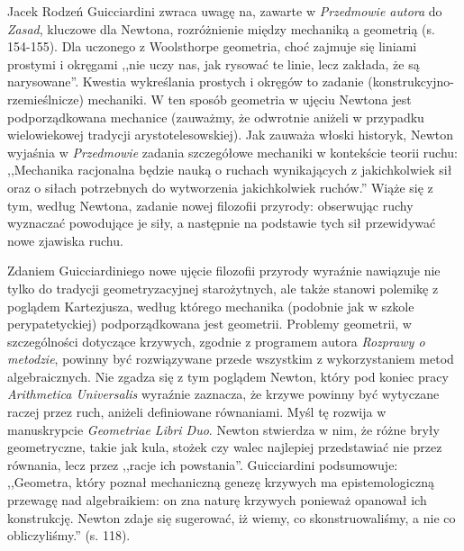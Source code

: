 \begin{recplenv}{Jacek Rodzeń}
Guicciardini zwraca uwagę na, zawarte w \textit{Przedmowie autora} do \textit{Zasad}, kluczowe dla Newtona,
rozróżnienie między mechaniką a geometrią (s. 154-155). Dla uczonego z Woolsthorpe geometria, choć zajmuje się liniami
prostymi i okręgami ,,nie uczy nas, jak rysować te linie, lecz zakłada, że są narysowane''. Kwestia wykreślania prostych
i okręgów to zadanie (konstrukcyjno-rzemieślnicze) mechaniki. W ten sposób geometria w ujęciu Newtona jest
podporządkowana mechanice (zauważmy, że odwrotnie aniżeli w przypadku wielowiekowej tradycji arystotelesowskiej). Jak
zauważa włoski historyk, Newton wyjaśnia w \textit{Przedmowie} zadania szczegółowe mechaniki w kontekście teorii ruchu:
,,Mechanika racjonalna będzie nauką o ruchach wynikających z jakichkolwiek sił oraz o siłach potrzebnych do wytworzenia
jakichkolwiek ruchów.'' Wiąże się z tym, według Newtona, zadanie nowej filozofii przyrody: obserwując ruchy wyznaczać
powodujące je siły, a następnie na podstawie tych sił przewidywać nowe zjawiska ruchu. 

Zdaniem Guicciardiniego nowe ujęcie filozofii przyrody wyraźnie nawiązuje nie tylko do tradycji geometryzacyjnej
starożytnych, ale także stanowi polemikę z poglądem Kartezjusza, według którego mechanika (podobnie jak w szkole
perypatetyckiej) podporządkowana jest geometrii. Problemy geometrii, w szczególności dotyczące krzywych, zgodnie z
programem autora \textit{Rozprawy o metodzie}, powinny być rozwiązywane przede wszystkim z wykorzystaniem metod
algebraicznych. Nie zgadza się z tym poglądem Newton, który pod koniec pracy \textit{Arithmetica Universalis} wyraźnie
zaznacza, że krzywe powinny być wytyczane raczej przez ruch, aniżeli definiowane równaniami. Myśl tę rozwija w
manuskrypcie \textit{Geometriae Libri Duo}. Newton stwierdza w nim, że różne bryły geometryczne, takie jak kula, stożek
czy walec najlepiej przedstawiać nie przez równania, lecz przez ,,racje ich powstania''. Guicciardini podsumowuje:
,,Geometra, który poznał mechaniczną genezę krzywych ma epistemologiczną przewagę nad algebraikiem: on zna naturę
krzywych ponieważ opanował ich konstrukcję. Newton zdaje się sugerować, iż wiemy, co skonstruowaliśmy, a nie co
obliczyliśmy.'' (s. 118).


\end{recplenv}
